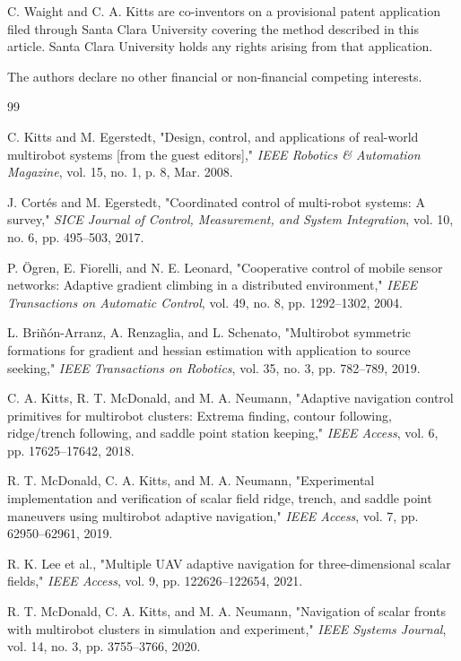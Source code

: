 \documentclass[lettersize,journal]{IEEEtran}
\begin{document}
C. Waight and C. A. Kitts are co-inventors on a provisional patent application filed through Santa Clara University covering the method described in this article. Santa Clara University holds any rights arising from that application.

The authors declare no other financial or non-financial competing interests.


\begin{thebibliography}{99}

 C. Kitts and M. Egerstedt, "Design, control, and applications of real-world multirobot systems [from the guest editors]," \textit{IEEE Robotics \& Automation Magazine}, vol. 15, no. 1, p. 8, Mar. 2008.

 J. Cortés and M. Egerstedt, "Coordinated control of multi-robot systems: A survey," \textit{SICE Journal of Control, Measurement, and System Integration}, vol. 10, no. 6, pp. 495--503, 2017.

 P. Ögren, E. Fiorelli, and N. E. Leonard, "Cooperative control of mobile sensor networks: Adaptive gradient climbing in a distributed environment," \textit{IEEE Transactions on Automatic Control}, vol. 49, no. 8, pp. 1292--1302, 2004.

 L. Briñón-Arranz, A. Renzaglia, and L. Schenato, "Multirobot symmetric formations for gradient and hessian estimation with application to source seeking," \textit{IEEE Transactions on Robotics}, vol. 35, no. 3, pp. 782--789, 2019.

 C. A. Kitts, R. T. McDonald, and M. A. Neumann, "Adaptive navigation control primitives for multirobot clusters: Extrema finding, contour following, ridge/trench following, and saddle point station keeping," \textit{IEEE Access}, vol. 6, pp. 17625--17642, 2018.

 R. T. McDonald, C. A. Kitts, and M. A. Neumann, "Experimental implementation and verification of scalar field ridge, trench, and saddle point maneuvers using multirobot adaptive navigation," \textit{IEEE Access}, vol. 7, pp. 62950--62961, 2019.

 R. K. Lee et al., "Multiple UAV adaptive navigation for three-dimensional scalar fields," \textit{IEEE Access}, vol. 9, pp. 122626--122654, 2021.

 R. T. McDonald, C. A. Kitts, and M. A. Neumann, "Navigation of scalar fronts with multirobot clusters in simulation and experiment," \textit{IEEE Systems Journal}, vol. 14, no. 3, pp. 3755--3766, 2020.


\end{thebibliography}
\end{document}
